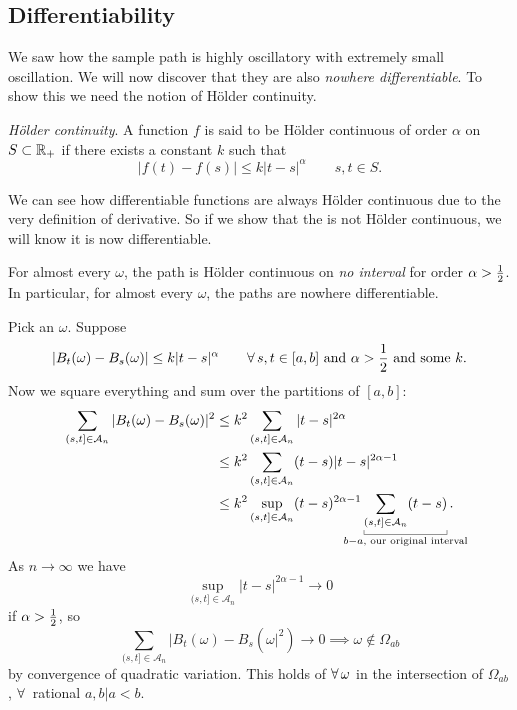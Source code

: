 \documentclass[12pt]{report}
\begin{document}
\subsection{Differentiability}
We saw how the sample path is highly oscillatory with extremely small oscillation. We will now discover that they are also \emph{nowhere differentiable}. To show this we need the notion of Hölder continuity.
\begin{definition}
	\emph{Hölder continuity}. A function $f$ is said to be Hölder continuous of order $\alpha$ on $S\subset\mathbb{R}_{+}$ if there exists a constant $k$ such that
	\begin{equation*}
		|f(t)-f(s)|\leq k|t-s|^\alpha\qquad s,t\in S.
	\end{equation*}
\end{definition}
We can see how differentiable functions are always Hölder continuous due to the very definition of derivative. So if we show that the \bwm{} is not Hölder continuous, we will know it is now differentiable.
\begin{proposition}
	For almost every $\omega$, the \bwm{} path is Hölder continuous on \emph{no interval} for order $\alpha>\frac{1}{2}$. In particular, for almost every $\omega$, the paths are nowhere differentiable.
\end{proposition}
\begin{fancyproof}
	Pick an $\omega$. Suppose
	\begin{equation*}
		|B_{t}(\omega)-B_{s}(\omega)|\leq k|t-s|^{\alpha}\qquad\forall\, s,t\in[a,b]\text{ and }\alpha>\frac{1}{2}\text{ and some }k.
	\end{equation*}
	Now we square everything and sum over the partitions of $[a,b]$:
	\begin{align*}
		\sum_{(s,t]\in\mathcal{A}_{n}}|B_{t}(\omega)-B_{s}(\omega)|^{2}&\leq k^{2}\sum_{(s,t]\in\mathcal{A}_{n}}|t-s|^{2\alpha}\\
		&\leq k^{2}\sum_{(s,t]\in\mathcal{A}_{n}}(t-s)|t-s|^{2\alpha-1}\\
		&\leq k^{2}\sup_{(s,t]\in\mathcal{A}_{n}}(t-s)^{2\alpha -1}\ubracketthin{\sum_{(s,t]\in\mathcal{A}_{n}}(t-s)}_{\mathclap{b-a,\text{ our original interval}}}.
	\end{align*}
	As $n\to\infty$ we have $$\sup_{(s,t]\in\mathcal{A}_{n}}|t-s|^{2\alpha-1}\to0$$ if $\alpha>\frac{1}{2}$, so
	\begin{equation*}
		\sum_{(s,t]\in\mathcal{A}_{n}}|B_{t}(\omega)-B_{s}(\omega|^{2})\to0\implies\omega\notin\Omega_{ab}
	\end{equation*}
	by convergence of quadratic variation. This holds of $\forall\,\omega$ in the intersection of $\Omega_{ab}$, $\forall\,$ rational $a,b|a<b$.
\end{fancyproof}
\end{document}
